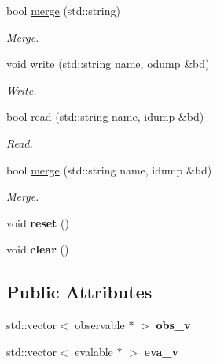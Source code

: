 \begin{CompactItemize}
bool \hyperlink{classmeasurements_ecbd633babf361d23fc1119bcb786b63}{merge} (std::string)
\begin{CompactList}\small\item\em Merge. \item\end{CompactList}\item 
void \hyperlink{classmeasurements_035e31e9821c0e4d6dbe853c5d813bd7}{write} (std::string name, odump \&bd)
\begin{CompactList}\small\item\em Write. \item\end{CompactList}\item 
bool \hyperlink{classmeasurements_d50ae0faa7d3a20190bb49cfdad450cc}{read} (std::string name, idump \&bd)
\begin{CompactList}\small\item\em Read. \item\end{CompactList}\item 
bool \hyperlink{classmeasurements_43b7fecf4ea146bbe9e9941dbb80e914}{merge} (std::string name, idump \&bd)
\begin{CompactList}\small\item\em Merge. \item\end{CompactList}\item 
\hypertarget{classmeasurements_1abc6879ee2b20d9360e8839b04febbc}{
void \textbf{reset} ()}
\label{classmeasurements_1abc6879ee2b20d9360e8839b04febbc}

\item 
\hypertarget{classmeasurements_9ad625bb739eacebd77c8f8deb1c2dae}{
void \textbf{clear} ()}
\label{classmeasurements_9ad625bb739eacebd77c8f8deb1c2dae}

\end{CompactItemize}
\subsection*{Public Attributes}
\begin{CompactItemize}
\item 
\hypertarget{classmeasurements_86893baf0dafc9850a06ff57a0f42d4e}{
std::vector$<$ observable $\ast$ $>$ \textbf{obs\_\-v}}
\label{classmeasurements_86893baf0dafc9850a06ff57a0f42d4e}

\item 
\hypertarget{classmeasurements_4da35b6e5288cdeedcd43b2a9c127ec0}{
std::vector$<$ evalable $\ast$ $>$ \textbf{eva\_\-v}}
\label{classmeasurements_4da35b6e5288cdeedcd43b2a9c127ec0}

\end{CompactItemize}


